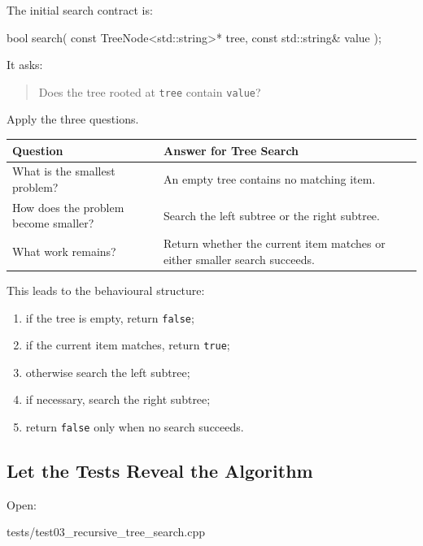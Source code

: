 \documentclass{csc2059practical}
\begin{document}
The initial search contract is:

\begin{cppcode}
bool search(
    const TreeNode<std::string>* tree,
    const std::string& value
);
\end{cppcode}

It asks:

\begin{quote}
Does the tree rooted at \texttt{tree} contain
\texttt{value}?
\end{quote}

Apply the three questions.

\begin{center}
\begin{tabular}{p{} p{}}
\toprule
\textbf{Question} & \textbf{Answer for Tree Search} \\
\midrule
What is the smallest problem? &
An empty tree contains no matching item. \\
How does the problem become smaller? &
Search the left subtree or the right subtree. \\
What work remains? &
Return whether the current item matches or either smaller search succeeds. \\
\bottomrule
\end{tabular}
\end{center}

This leads to the behavioural structure:

\begin{enumerate}
    \item if the tree is empty, return \texttt{false};
    \item if the current item matches, return \texttt{true};
    \item otherwise search the left subtree;
    \item if necessary, search the right subtree;
    \item return \texttt{false} only when no search succeeds.
\end{enumerate}


\subsection{Let the Tests Reveal the Algorithm}

Open:

\begin{terminal}
tests/test03_recursive_tree_search.cpp
\end{terminal}
\end{document}
